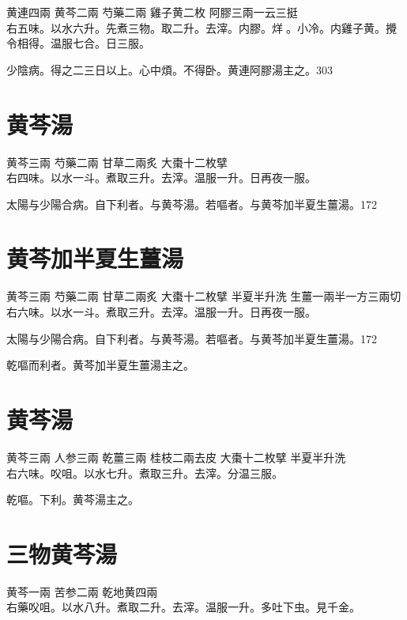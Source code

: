 黄連{\scriptsize 四兩} 黄芩{\scriptsize 二兩} 芍藥{\scriptsize 二兩} 雞子黄{\scriptsize 二枚} 阿膠{\scriptsize 三兩一云三挺}\\
右五味。以水六升。先煮三物。取二升。去滓。内膠。烊{\sungii 𥁞}。小冷。内雞子黄。攪令相得。温服七合。日三服。

少陰病。得之二三日以上。心中煩。不得卧。黄連阿膠湯主之。303

\section{黄芩湯}

黄芩{\scriptsize 三兩} 芍藥{\scriptsize 二兩} 甘草{\scriptsize 二兩炙} 大棗{\scriptsize 十二枚擘}\\
右四味。以水一斗。煮取三升。去滓。温服一升。日再夜一服。

太陽与少陽合病。自下利者。与黄芩湯。若嘔者。与黄芩加半夏生薑湯。172

\section{黄芩加半夏生薑湯}

黄芩{\scriptsize 三兩} 芍藥{\scriptsize 二兩} 甘草{\scriptsize 二兩炙} 大棗{\scriptsize 十二枚擘} 半夏{\scriptsize 半升洗} 生薑{\scriptsize 一兩半一方三兩切}\\
右六味。以水一斗。煮取三升。去滓。温服一升。日再夜一服。

太陽与少陽合病。自下利者。与黄芩湯。若嘔者。与黄芩加半夏生薑湯。172

乾嘔而利者。黄芩加半夏生薑湯主之。

\section{黄芩湯}

黄芩{\scriptsize 三兩} 人参{\scriptsize 三兩} 乾薑{\scriptsize 三兩} 桂枝{\scriptsize 二兩去皮} 大棗{\scriptsize 十二枚擘} 半夏{\scriptsize 半升洗}\\
右六味。㕮咀。以水七升。煮取三升。去滓。分温三服。

乾嘔。下利。黄芩湯主之。

\section{三物黄芩湯}

黄芩{\scriptsize 一兩} 苦参{\scriptsize 二兩} 乾地黄{\scriptsize 四兩}\\
右藥㕮咀。以水八升。煮取二升。去滓。温服一升。多吐下虫。{\scriptsize 見千金。}

